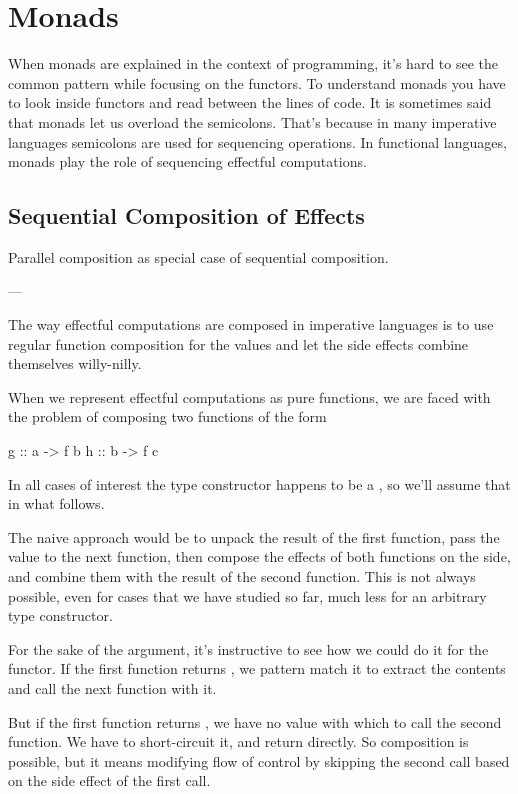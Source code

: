 \documentclass[DaoFP]{subfiles}
\begin{document}
\setcounter{chapter}{14}

\chapter{Monads}

When monads are explained in the context of programming, it's hard to see the common pattern while focusing on the functors. To understand monads you have to look inside functors and read between the lines of code. It is sometimes said that monads let us overload the semicolons. That's because in many imperative languages semicolons are used for sequencing operations. In functional languages, monads play the role of sequencing effectful computations.

\section{Sequential Composition of Effects}

Parallel composition as special case of sequential composition.

---

The way effectful computations are composed in imperative languages is to use regular function composition for the values and let the side effects combine themselves willy-nilly. 

When we represent effectful computations as pure functions, we are faced with the problem of composing two functions of the form
\begin{haskell}
g :: a -> f b
h :: b -> f c
\end{haskell}
In all cases of interest the type constructor  happens to be a , so we'll assume that in what follows.

The naive approach would be to unpack the result of the first function, pass the value to the next function, then compose the effects of both functions on the side, and combine them with the result of the second function. This is not always possible, even for cases that we have studied so far, much less for an arbitrary type constructor.

For the sake of the argument, it's instructive to see how we could do it for the  functor. If the first function returns , we pattern match it to extract the contents and call the next function with it.

But if the first function returns , we have no value with which to call the second function. We have to short-circuit it, and return  directly. So composition is possible, but it means modifying flow of control by skipping the second call based on the side effect of the first call. 
\end{document}
